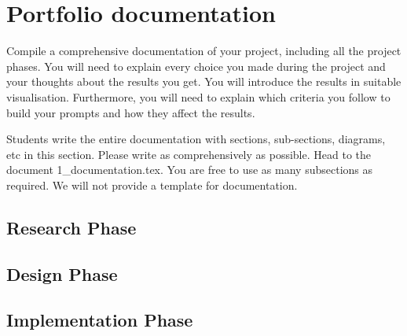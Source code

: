 \setcounter{page}{1}
\section{Portfolio documentation}
\label{sec:documentation}

Compile a comprehensive documentation of your project, including all the project phases. You will need to explain every choice you made during the project and your thoughts about the results you get. You will introduce the results in suitable visualisation. Furthermore, you will need to explain which criteria you follow to build your prompts and how they affect the results. 

Students write the entire documentation with sections, sub-sections, diagrams, etc in this section. Please write as comprehensively as possible. Head to the document 1\_documentation.tex. You are free to use as many subsections as required. We will not provide a template for documentation. 

\subsection{Research Phase}
\label{subsec:research}

\subsection{Design Phase}
\label{subsec:design}

\subsection{Implementation Phase}
\label{subsec:implementation}